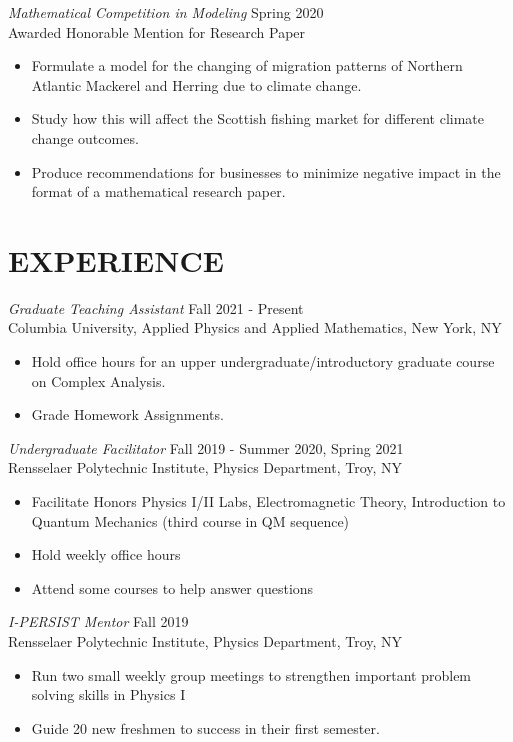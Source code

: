 \documentclass[margin]{rpires}
\begin{document}
\begin{resume}
    {\sl Mathematical Competition in Modeling} \hfill Spring 2020 \\
    Awarded Honorable Mention for Research Paper
    \begin{itemize}  \itemsep -2pt %
        \item Formulate a model for the changing of migration patterns of Northern Atlantic Mackerel and Herring due to climate change.
        \item Study how this will affect the Scottish fishing market for different climate change outcomes.
        \item Produce recommendations for businesses to minimize negative impact in the format of a mathematical research paper.
    \end{itemize}
\newpage
\section{EXPERIENCE}
    {\sl Graduate Teaching Assistant} \hfill Fall 2021 - Present \\
    Columbia University, Applied Physics and Applied Mathematics, New York, NY
    \begin{itemize}  \itemsep -2pt %
        \item Hold office hours for an upper undergraduate/introductory graduate course on Complex Analysis.
        \item Grade Homework Assignments. 
    \end{itemize}    


    {\sl Undergraduate Facilitator} \hfill Fall 2019 - Summer 2020, Spring 2021 \\
    Rensselaer Polytechnic Institute, Physics Department, Troy, NY
    \begin{itemize}  \itemsep -2pt %
        \item Facilitate Honors Physics I/II Labs, Electromagnetic Theory, Introduction to Quantum Mechanics (third course in QM sequence)
        \item Hold weekly office hours
        \item Attend some courses to help answer questions
    \end{itemize}

    {\sl I-PERSIST Mentor} \hfill Fall 2019 \\
    Rensselaer Polytechnic Institute, Physics Department, Troy, NY
    \begin{itemize}  \itemsep -2pt %
        \item Run two small weekly group meetings to strengthen important problem solving skills in Physics I 
        \item Guide 20 new freshmen to success in their first semester.
    \end{itemize}


\end{resume}
\end{document}
